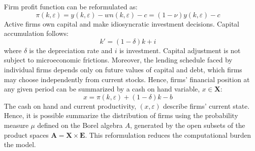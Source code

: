 \documentclass[12pt]{article}
\begin{document}
Firm profit function can be reformulated as: 
\begin{equation} \label{eq:profit}
\pi(k,\varepsilon) = y(k,\varepsilon) - wn(k,\varepsilon) - c = (1-\nu) y(k,\varepsilon) - c
\end{equation} 
Active firms own capital and make idiosyncratic investment decisions. Capital accumulation follows: 
\begin{equation} \label{eq:capital}
k' = (1-\delta)k + i
\end{equation} 
where $\delta$ is the depreciation rate and $i$ is investment. Capital adjustment is not subject to microeconomic frictions. Moreover, the lending schedule faced by individual firms depends only on future values of capital and debt, which firms may choose independently from current stocks. Hence, firms' financial position at any given period can be summarized by a cash on hand variable, $x \in \mathbf{X}$: 
\begin{equation} \label{eq:cash on hand}
    x = \pi(k,\varepsilon) + (1-\delta)k - b 
\end{equation}
The cash on hand and current productivity, $(x, \varepsilon)$ describe firms' current state. Hence, it is possible summarize the distribution of firms using the probability measure $\mu$ defined on the Borel algebra $A$, generated by the open subsets of the product spaces $ \mathbf{A} = \mathbf{X} \times \mathbf{E} $.  This reformulation reduces the computational burden the model. 
\end{document}
